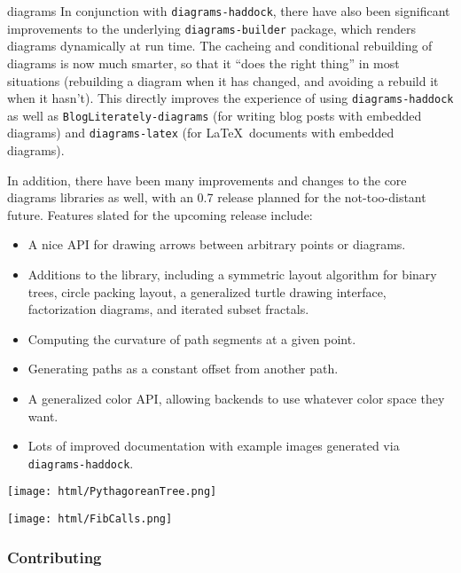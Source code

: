 \begin{hcarentry}[updated]{diagrams}
In conjunction with \texttt{diagrams-haddock}, there have also been
significant improvements to the underlying \texttt{diagrams-builder}
package, which renders diagrams dynamically at run time.  The cacheing
and conditional rebuilding of diagrams is now much smarter, so that it
``does the right thing'' in most situations (rebuilding a diagram when
it has changed, and avoiding a rebuild it when it hasn't).  This
directly improves the experience of using \texttt{diagrams-haddock} as
well as \texttt{BlogLiterately-diagrams} (for writing blog posts with
embedded diagrams) and \texttt{diagrams-latex} (for \LaTeX\ documents
with embedded diagrams).

In addition, there have been many improvements and changes to the core
diagrams libraries as well, with an 0.7 release planned for the
not-too-distant future. Features slated for the upcoming release
include:
\begin{itemize}
\item A nice API for drawing arrows between arbitrary points or diagrams.
\item Additions to the  library, including a
  symmetric layout algorithm for binary trees, circle packing layout, a
  generalized turtle drawing interface, factorization diagrams, and
  iterated subset fractals.
\item Computing the curvature of path segments at a given point.
\item Generating paths as a constant offset from another path.
\item A generalized color API, allowing backends to use whatever color
  space they want.
\item Lots of improved documentation with example images generated via
  \texttt{diagrams-haddock}.
\end{itemize}

\begin{center}
\texttt{[image: html/PythagoreanTree.png]}
\end{center}


\begin{center}
\texttt{[image: html/FibCalls.png]}
\end{center}

\subsubsection*{Contributing}


\end{hcarentry}
